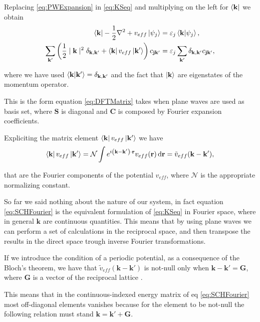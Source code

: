 \documentclass[a4paper,12pt]{article}
\newcommand\mf[1]{\mathbf{#1}}
\newcommand\erre{\mathbf{r}}
\begin{document}
Replacing \eqref{eq:PWExpansion} in \eqref{eq:KSeq} and multiplying on the left for $\bra{\mf{k}}$ we obtain \cite{Martin} 
\begin{align}
	\bra{\mf{k}} -\frac{1}{2}\nabla^2 + v_{eff} \ket{\psi_j} &= \varepsilon_j \bra{\mf{k}}\ket{\psi_j},  \\
	\sum_{\mf{k'}} \left( \frac{1}{2}\mid\mf{k}\mid^2  \delta_{\mf{k},\mf{k'}} + \bra{\mf{k}}v_{eff}\ket{\mf{k'}} \right) c_{\mathbf{jk'}} &= \varepsilon_j \sum_{\mf{k'}} \delta_{\mf{k},\mf{k'}} c_{\mathbf{jk'}} \label{eq:SCHFourier},
\end{align}

where we have used $\bra{\mf{k}}\ket{\mf{k'}} = \delta_{\mf{k},\mf{k'}}$ and the fact that $\ket{\mf{k}}$ are eigenstates of the momentum operator.

This is the form equation \eqref{eq:DFTMatrix} takes when plane waves are used as basis set, where $\mathbf{S}$ is diagonal and $\mathbf{C}$ is composed by Fourier expansion coefficients.

Expliciting the matrix element $\bra{\mf{k}} v_{eff} \ket{\mf{k'}}$ we have \cite{Martin} 
\begin{equation}
	\bra{\mf{k}} v_{eff} \ket{\mf{k'}} = \mathcal{N} \int e^{i\left(\mf{k} - \mf{k'} \right) \cdot \erre} v_{eff}(\erre) \dd{\erre} = \tilde{v}_{eff}(\mf{k} - \mf{k'}),
\end{equation}

that are the Fourier components of the potential $v_{eff}$, where $\mathcal{N}$ is the appropriate normalizing constant.

So far we said nothing about the nature of our system, in fact equation \eqref{eq:SCHFourier} is the equivalent formulation of \eqref{eq:KSeq} in Fourier space, where in general $\mf{k}$ are continuous quantities.
This means that by using plane waves we can perform a set of calculations in the reciprocal space, and then transpose the results in the direct space trough inverse Fourier transformations.

If we introduce the condition of a periodic potential, as a consequence of the Bloch's theorem, we have that $\tilde{v}_{eff}(\mf{k} - \mf{k'})$ is not-null only when $\mf{k} - \mf{k'} = \mf{G}$, where $\mf{G}$ is a vector of the reciprocal lattice \cite{Martin}.

This means that in the continuous-indexed energy matrix of eq \eqref{eq:SCHFourier} most off-diagonal elements vanishes because for the element to be not-null the following relation must stand $\mf{k} = \mf{k'} + \mf{G}$.
\end{document}
